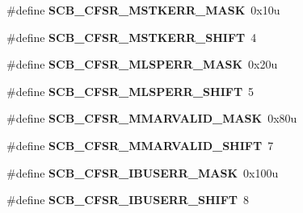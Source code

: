 \begin{DoxyCompactItemize}
\item 
\hypertarget{group___s_c_b___register___masks_ga95a121d163a281a5857b873d1c286ce7}{}\#define {\bfseries S\+C\+B\+\_\+\+C\+F\+S\+R\+\_\+\+M\+S\+T\+K\+E\+R\+R\+\_\+\+M\+A\+S\+K}~0x10u\label{group___s_c_b___register___masks_ga95a121d163a281a5857b873d1c286ce7}

\item 
\hypertarget{group___s_c_b___register___masks_ga38e35b9d6146129c17899783776fa35c}{}\#define {\bfseries S\+C\+B\+\_\+\+C\+F\+S\+R\+\_\+\+M\+S\+T\+K\+E\+R\+R\+\_\+\+S\+H\+I\+F\+T}~4\label{group___s_c_b___register___masks_ga38e35b9d6146129c17899783776fa35c}

\item 
\hypertarget{group___s_c_b___register___masks_gaf36b31549f168548f949e28499e2a11e}{}\#define {\bfseries S\+C\+B\+\_\+\+C\+F\+S\+R\+\_\+\+M\+L\+S\+P\+E\+R\+R\+\_\+\+M\+A\+S\+K}~0x20u\label{group___s_c_b___register___masks_gaf36b31549f168548f949e28499e2a11e}

\item 
\hypertarget{group___s_c_b___register___masks_ga09b8b9218995685f5c47d5e014a33ed0}{}\#define {\bfseries S\+C\+B\+\_\+\+C\+F\+S\+R\+\_\+\+M\+L\+S\+P\+E\+R\+R\+\_\+\+S\+H\+I\+F\+T}~5\label{group___s_c_b___register___masks_ga09b8b9218995685f5c47d5e014a33ed0}

\item 
\hypertarget{group___s_c_b___register___masks_gad42b2161c992b108aa9b1c88c2e0fac0}{}\#define {\bfseries S\+C\+B\+\_\+\+C\+F\+S\+R\+\_\+\+M\+M\+A\+R\+V\+A\+L\+I\+D\+\_\+\+M\+A\+S\+K}~0x80u\label{group___s_c_b___register___masks_gad42b2161c992b108aa9b1c88c2e0fac0}

\item 
\hypertarget{group___s_c_b___register___masks_ga9ed3b69e4bf0a566776861bf71ab3b5e}{}\#define {\bfseries S\+C\+B\+\_\+\+C\+F\+S\+R\+\_\+\+M\+M\+A\+R\+V\+A\+L\+I\+D\+\_\+\+S\+H\+I\+F\+T}~7\label{group___s_c_b___register___masks_ga9ed3b69e4bf0a566776861bf71ab3b5e}

\item 
\hypertarget{group___s_c_b___register___masks_ga29d8da9b3008e7df9d69350f2ee27f45}{}\#define {\bfseries S\+C\+B\+\_\+\+C\+F\+S\+R\+\_\+\+I\+B\+U\+S\+E\+R\+R\+\_\+\+M\+A\+S\+K}~0x100u\label{group___s_c_b___register___masks_ga29d8da9b3008e7df9d69350f2ee27f45}

\item 
\hypertarget{group___s_c_b___register___masks_ga1aa08cf9e3fac4da9832af74060a18e6}{}\#define {\bfseries S\+C\+B\+\_\+\+C\+F\+S\+R\+\_\+\+I\+B\+U\+S\+E\+R\+R\+\_\+\+S\+H\+I\+F\+T}~8\label{group___s_c_b___register___masks_ga1aa08cf9e3fac4da9832af74060a18e6}


\end{DoxyCompactItemize}
